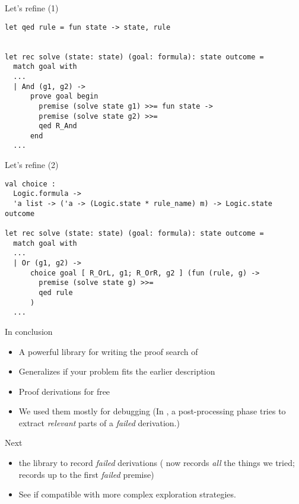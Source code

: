 \documentclass[final,xetex]{beamer}
\begin{document}
\begin{frame}[fragile]{Let's refine (1)}
  \begin{verbatim}
let qed rule = fun state -> state, rule


let rec solve (state: state) (goal: formula): state outcome =
  match goal with
  ...
  | And (g1, g2) ->
      prove goal begin
        premise (solve state g1) >>= fun state ->
        premise (solve state g2) >>=
        qed R_And
      end
  ...
  \end{verbatim}
\end{frame}

\begin{frame}[fragile]{Let's refine (2)}
  \begin{verbatim}
val choice :
  Logic.formula ->
  'a list -> ('a -> (Logic.state * rule_name) m) -> Logic.state outcome

let rec solve (state: state) (goal: formula): state outcome =
  match goal with
  ...
  | Or (g1, g2) ->
      choice goal [ R_OrL, g1; R_OrR, g2 ] (fun (rule, g) ->
        premise (solve state g) >>=
        qed rule
      )
  ...
  \end{verbatim}
\end{frame}

\begin{frame}{In conclusion}
  \begin{itemize}
    \item A powerful library for writing the proof search of \mezzo
    \item Generalizes if your problem fits the earlier description
    \item Proof derivations for free
    \item We used them mostly for debugging {\tiny(In \mezzo, a post-processing
      phase tries to extract \emph{relevant} parts of a \emph{failed}
      derivation.)}
  \end{itemize}
\end{frame}

\begin{frame}{Next}
  \begin{itemize}
    \item {} the library to record \emph{failed} derivations
      {\tiny( now records \emph{all} the things we tried; \code{>>=}
      records up to the first \emph{failed} premise)}
    \item See if compatible with more complex exploration strategies.
  \end{itemize}
\end{frame}
\end{document}
